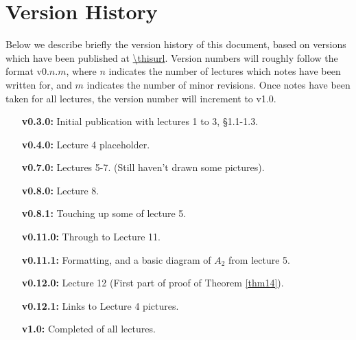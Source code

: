 \section{Version History}
Below we describe briefly the version history of this document, based on
versions which have been published at \url{\thisurl}. Version numbers will
roughly follow the format v0.$n$.$m$, where $n$ indicates the number of
lectures which notes have been written for, and $m$ indicates the number of
minor revisions. Once notes have been taken for all lectures, the version
number will increment to v1.0.

\begin{enumerate}
\item[\bf v0.3.0:] Initial publication with lectures 1 to 3, \S1.1-1.3.
\item[\bf v0.4.0:] Lecture 4 placeholder.
\item[\bf v0.7.0:] Lectures 5-7. (Still haven't drawn some pictures).
\item[\bf v0.8.0:] Lecture 8.
\item[\bf v0.8.1:] Touching up some of lecture 5.
\item[\bf v0.11.0:] Through to Lecture 11.
\item[\bf v0.11.1:] Formatting, and a basic diagram of $A_2$ from lecture 5.
\item[\bf v0.12.0:] Lecture 12 (First part of proof of Theorem \ref{thm14}).
\item[\bf v0.12.1:] Links to Lecture 4 pictures.
\item[\bf v1.0:] Completed of all lectures.
\end{enumerate}
